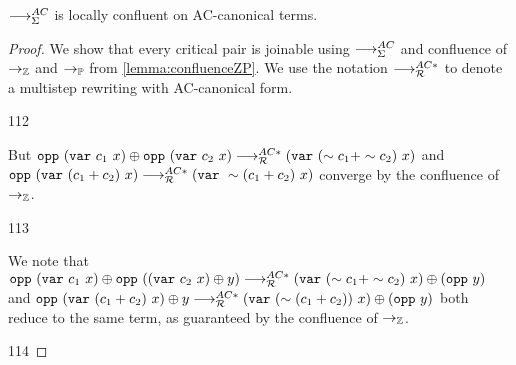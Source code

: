 \begin{lemma} 
	$\ACcanon$ is locally confluent on AC-canonical terms.
\end{lemma}
\begin{proof}
We show that every critical pair is joinable using $\ACcanon$ and confluence of $\ra_\bb{Z}$ and $\ra_\bb{P}$ from \cref{lemma:confluenceZP}.
We use the notation $\MRAC$ to denote a multistep rewriting with AC-canonical form.

\begin{center}
\cp
{
}
{
   \oplus {}
}
{
}
{11}{2}
\end{center}

But $\opp{\var{c_1}{x}} \oplus \opp{\var{c_2}{x}} \MRAC \var{(\sim c_1 + \sim c_2)}{x}$
and $\opp{\var{(c_1 + c_2)}{x}} \MRAC \var{\sim (c_1 + c_2)}{x}$ converge by the confluence of $\ra_\bb{Z}$.

\cp
{
}
{
   \oplus {}
}
{
}
{11}{3}

We note that $\opp{\var{c_1}{x}} \oplus \opp{(\var{c_2}{x} \oplus y)} \MRAC \add{\var{(\sim c_1 + \sim c_2)}{x}}{(\opp{y})}$
and $\opp{\var{(c_1 + c_2)}{x} \oplus y} \MRAC \add{\var{(\sim (c_1 + c_2))}{x}}{(\opp{y})}$
both reduce to the same term, as guaranteed by the confluence of $\ra_\bb{Z}$.

{
   \oplus {}
}
{
}
{11}{4}


\end{proof}
